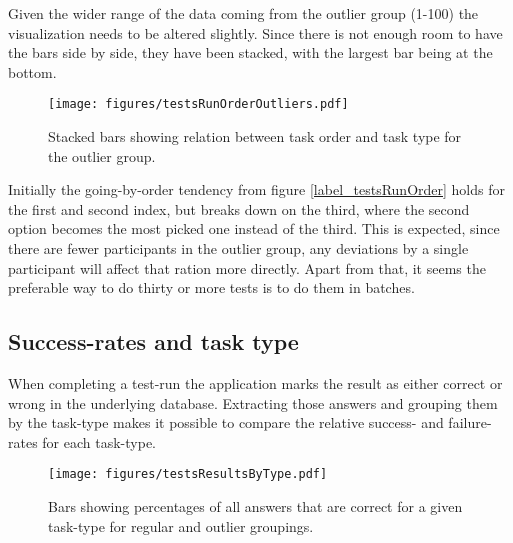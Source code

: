     Given the wider range of the data coming from the outlier group (1-100)
    the visualization needs to be altered slightly. Since there is not
    enough room to have the bars side by side, they have been stacked, with
    the largest bar being at the bottom.
    \begin{figure}[ht!]
      \centering
      \texttt{[image: figures/testsRunOrderOutliers.pdf]}
      \caption{
        Stacked bars showing relation between task order and task type for
        the outlier group.
      }
    \end{figure}

    Initially the going-by-order tendency from figure
    \ref{label_testsRunOrder} holds for the first and second index, but breaks down
    on the third, where the second option becomes the most picked one instead
    of the third. This is expected, since there are fewer participants in the
    outlier group, any deviations by a single participant will affect that
    ration more directly. Apart from that, it seems the preferable way to do
    thirty or more tests is to do them in batches.



%

  \subsection{Success-rates and task type}

    When completing a test-run the application marks the result as
    either correct or wrong in the underlying database. Extracting
    those answers and grouping them by the task-type makes it possible to
    compare the relative success- and failure-rates for each task-type.

    \begin{figure}[h!]
      \centering
      \texttt{[image: figures/testsResultsByType.pdf]}
      \caption{
        Bars showing percentages of all answers that are correct for a
        given task-type for regular and outlier groupings.
      }
    \end{figure}

